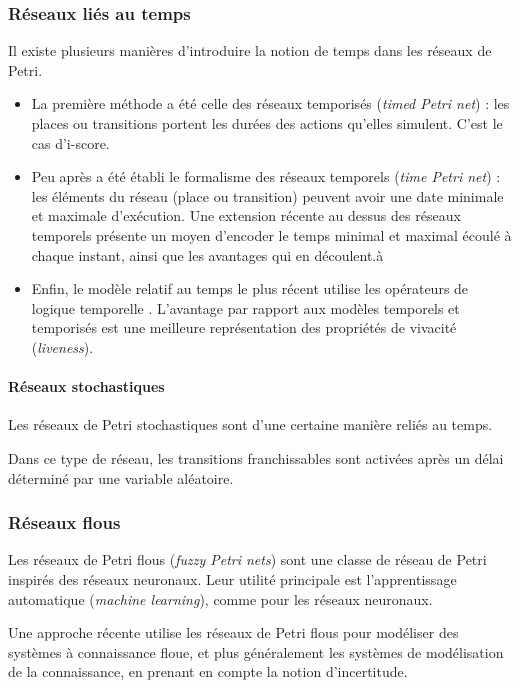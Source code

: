 \subsubsection{Réseaux liés au temps}
Il existe plusieurs manières d'introduire la notion de temps dans les réseaux de Petri.
\begin{itemize}
\item La première méthode a été celle des réseaux temporisés (\textit{timed Petri net}) : les places ou transitions portent les durées des actions qu'elles simulent. C'est le cas d'i-score.

\item Peu après a été établi le formalisme des réseaux temporels (\textit{time Petri net}) : les éléments du réseau (place ou transition) peuvent avoir une date minimale et maximale d'exécution.
Une extension récente \cite{klai2013temporal} au dessus des réseaux temporels  présente un moyen d'encoder le temps minimal et maximal écoulé à chaque instant, ainsi que les avantages qui en découlent.à

\item Enfin, le modèle relatif au temps le plus récent utilise les opérateurs de logique temporelle \cite{logic2002temporal,suzuki1989temporal}. L'avantage par rapport aux modèles temporels et temporisés est une meilleure représentation des propriétés de vivacité (\textit{liveness}).
\end{itemize}
\paragraph{Réseaux stochastiques}
Les réseaux de Petri stochastiques \cite{bause1996stochastic} sont d'une certaine manière reliés au temps.

Dans ce type de réseau, les transitions franchissables sont activées après un délai déterminé par une variable aléatoire.
 
\subsubsection{Réseaux flous}
Les réseaux de Petri flous (\textit{fuzzy Petri nets}) \cite{pedrycz1994generalized} sont une classe de réseau de Petri inspirés des réseaux neuronaux. Leur utilité principale est l'apprentissage automatique (\textit{machine learning}), comme pour les réseaux neuronaux.

Une approche récente utilise les réseaux de Petri flous pour modéliser des systèmes à connaissance floue\cite{wang2014dynamic}, et plus généralement les systèmes de modélisation de la connaissance, en prenant en compte la notion d'incertitude.

